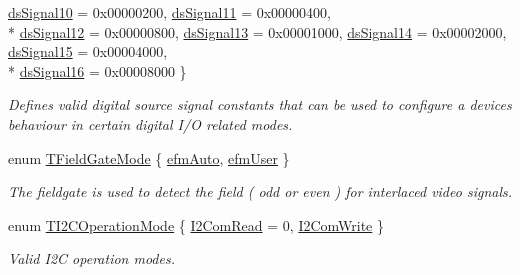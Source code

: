 \begin{DoxyCompactItemize}
\hyperlink{group___device_specific_interface_gga29840a466892bced617a5f3a6edb5218a59165459a47a91f2375ea57df9d52072}{ds\+Signal10} = 0x00000200, 
\hyperlink{group___device_specific_interface_gga29840a466892bced617a5f3a6edb5218aa6631d568dec58e022d0ae849e92aae2}{ds\+Signal11} = 0x00000400, 
\\*
\hyperlink{group___device_specific_interface_gga29840a466892bced617a5f3a6edb5218a0cbd27e13c9c86e14563a58b87930b27}{ds\+Signal12} = 0x00000800, 
\hyperlink{group___device_specific_interface_gga29840a466892bced617a5f3a6edb5218a5019d95fc1fbd878e0f0c3eb91361014}{ds\+Signal13} = 0x00001000, 
\hyperlink{group___device_specific_interface_gga29840a466892bced617a5f3a6edb5218a163fc766010f4228f067efb1147349c2}{ds\+Signal14} = 0x00002000, 
\hyperlink{group___device_specific_interface_gga29840a466892bced617a5f3a6edb5218a2bb5ea2206df1ec735abc6036d022b7a}{ds\+Signal15} = 0x00004000, 
\\*
\hyperlink{group___device_specific_interface_gga29840a466892bced617a5f3a6edb5218aa67e99b0093d8a02727e8c36f5c43dd9}{ds\+Signal16} = 0x00008000
 \}
\begin{DoxyCompactList}\small\item\em Defines valid digital source signal constants that can be used to configure a devices behaviour in certain digital I/\+O related modes. \end{DoxyCompactList}\item 
enum \hyperlink{group___device_specific_interface_gaa9f27b2d9c8c322f6d2f5eae6dbb18d1}{T\+Field\+Gate\+Mode} \{ \hyperlink{group___device_specific_interface_ggaa9f27b2d9c8c322f6d2f5eae6dbb18d1a5a9e40c67802414de65ec273d9622af3}{efm\+Auto}, 
\hyperlink{group___device_specific_interface_ggaa9f27b2d9c8c322f6d2f5eae6dbb18d1a0849c21f7b3eac3f093beac3054395d6}{efm\+User}
 \}
\begin{DoxyCompactList}\small\item\em The fieldgate is used to detect the field ( odd or even ) for interlaced video signals. \end{DoxyCompactList}\item 
enum \hyperlink{group___device_specific_interface_ga71e1af152f11720b7603b40de13855dc}{T\+I2\+C\+Operation\+Mode} \{ \hyperlink{group___device_specific_interface_gga71e1af152f11720b7603b40de13855dcad3cef1f116adccaa8314bbdad9fa07af}{I2\+Com\+Read} = 0, 
\hyperlink{group___device_specific_interface_gga71e1af152f11720b7603b40de13855dcad21f0293d31432d4106a5085a3adbfe7}{I2\+Com\+Write}
 \}
\begin{DoxyCompactList}\small\item\em Valid I2\+C operation modes. \end{DoxyCompactList}\item 

\end{DoxyCompactItemize}
